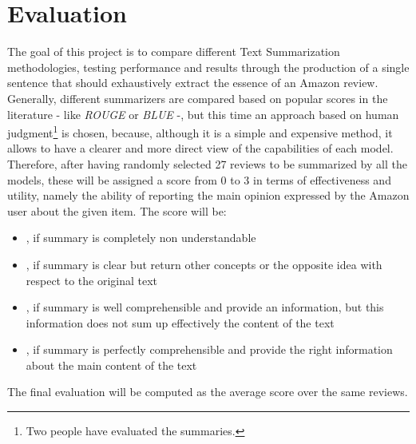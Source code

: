 \documentclass[fleqn,10pt]{SelfArx} %
\begin{document}
\section{Evaluation}
The goal of this project is to compare different Text Summarization methodologies, testing performance and results through the production of a single sentence that should exhaustively extract the essence of an Amazon review.\\
Generally, different summarizers are compared based on popular scores in the literature - like \textit{ROUGE} or \textit{BLUE} -, but this time an approach based on human judgment\footnote{Two people have evaluated the summaries.} is chosen, because, although it is a simple and expensive method, it allows to have a clearer and more direct view of the capabilities of each model. Therefore, after having randomly selected 27 reviews to be summarized by all the models, these will be assigned a score from 0 to 3 in terms of effectiveness and utility, namely the ability of reporting the main opinion expressed by the Amazon user about the given item. The score will be:
\begin{itemize}
    \item[\textbf{0}], if summary is completely non understandable
    \item[\textbf{1}], if summary is clear but return other concepts or the opposite idea with respect to the original text
    \item[\textbf{2}], if summary is well comprehensible and provide an information, but this information does not sum up effectively the content of the text
    \item[\textbf{3}], if summary is perfectly comprehensible and provide the right information about the main content of the text
\end{itemize}
The final evaluation will be computed as the average score over the same reviews.
\end{document}

